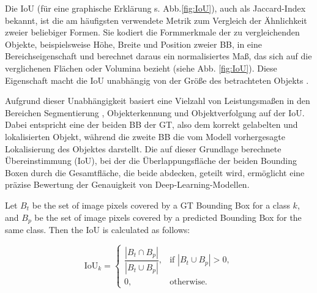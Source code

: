 Die \acrfull{IoU} (für eine graphische Erklärung s. Abb.\ref{fig:IoU}), auch als Jaccard-Index bekannt, ist die am häufigsten verwendete Metrik zum Vergleich der Ähnlichkeit zweier beliebiger Formen. Sie kodiert die Formmerkmale der zu vergleichenden Objekte, beispielsweise Höhe, Breite und Position zweier \acrfull{BB}, in eine Bereichseigenschaft und berechnet daraus ein normalisiertes Maß, das sich auf die verglichenen Flächen oder Volumina bezieht (siehe Abb. \ref{fig:IoU}). Diese Eigenschaft macht die \acrshort{IoU} unabhängig von der Größe des betrachteten Objekts \cite{Rezatofighi2019}.

Aufgrund dieser Unabhängigkeit basiert eine Vielzahl von Leistungsmaßen in den Bereichen Segmentierung \cite{Ramirez2019,cordts2016,Zhou2017,lin2015}, Objekterkennung \cite{lin2015,Everingham2010} und Objektverfolgung \cite{Kristan2016,lealtaixé2015} auf der \acrshort{IoU}. Dabei entspricht eine der beiden \acrshort{BB} der \acrfull{GT}, also dem korrekt gelabelten und lokalisierten Objekt, während die zweite \acrshort{BB} die vom Modell vorhergesagte Lokalisierung des Objektes darstellt. Die auf dieser Grundlage berechnete Übereinstimmung (\acrshort{IoU}), bei der die Überlappungsfläche der beiden Bounding Boxen durch die Gesamtfläche, die beide abdecken, geteilt wird, ermöglicht eine präzise Bewertung der Genauigkeit von Deep-Learning-Modellen.
\begin{definition}
    Let $B_t$ be the set of image pixels covered by a \acrlong{GT} Bounding Box for a class $k$, 
    and $B_p$ be the set of image pixels covered by a predicted Bounding Box for the same class. 
    Then the IoU is calculated as follows:

    \begin{equation}
    \text{IoU}_k =
    \begin{cases}
        \dfrac{|B_t \cap B_p|}{|B_t \cup B_p|}, & \text{if } |B_t \cup B_p| > 0, \\[6pt]
        0, & \text{otherwise.}
    \end{cases}
    \end{equation}

\end{definition}

